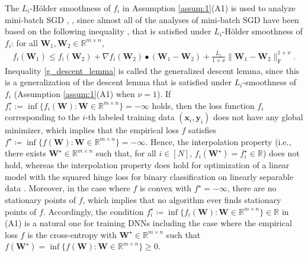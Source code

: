 \documentclass[twoside,11pt]{article}
\begin{document}
The $L_i$-H\"{o}lder smoothness \citep{Hoelder1882} of $f_i$ in Assumption \ref{assum:1}(A1) is used to analyze mini-batch SGD \citep[Assumption 4]{fatkhullin2025can}, \citep[Assumption 2.1]{yamada_2026}, since almost all of the analyses of mini-batch SGD have been based on the following inequality \citep[(2.5)]{Nesterov:2015aa}, \citep[Lemma 1]{Yashtini:2016aa} that is satisfied under $L_i$-H\"{o}lder smoothness of $f_i$: for all $\bm{W}_1, \bm{W}_2 \in \mathbb{R}^{m \times n}$,
\begin{align}\label{g_descent_lemma} 
f_i(\bm{W}_1) 
\leq f_i(\bm{W}_2) + \nabla f_i (\bm{W}_2) \bullet (\bm{W}_1 - \bm{W}_2)
+ \frac{L_i}{1 + \nu}\| \bm{W}_1 - \bm{W}_2 \|_{\mathrm{F}}^{1 + \nu}. 
\end{align}
Inequality \eqref{g_descent_lemma} is called the generalized descent lemma, since this is a generalization of the descent lemma \citep[Lemma 5.7]{beck2017} that is satisfied under $L_i$-smoothness of $f_i$ (Assumption \ref{assum:1}(A1) when $\nu = 1$). If $f_i^\star := \inf \{ f_i(\bm{W}) \colon \bm{W} \in \mathbb{R}^{m \times n} \} = - \infty$ holds, then the loss function $f_i$ corresponding to the $i$-th labeled training data $(\bm{x}_i, \bm{y}_i)$ does not have any global minimizer, which implies that the empirical loss $f$ satisfies $f^\star \coloneqq \inf \{ f(\bm{W}) \colon \bm{W} \in \mathbb{R}^{m \times n} \} = - \infty$. Hence, the interpolation property \citep[Section 4.3.1]{garrigos2024handbookconvergencetheoremsstochastic} (i.e., there exists $\bm{W}^\star \in \mathbb{R}^{m \times n}$ such that, for all $i\in [N]$, $f_i (\bm{W}^\star) = f_i^\star \in \mathbb{R}$) does not hold, whereas the interpolation property does hold for optimization of a linear model with the squared hinge loss for binary classification on linearly separable data \citep[Section 2]{NEURIPS2019_2557911c}. Moreover, in the case where $f$ is convex with $f^\star = - \infty$, there are no stationary points of $f$, which implies that no algorithm ever finds stationary points of $f$. Accordingly, the condition $f_i^\star \coloneqq \inf \{ f_i(\bm{W}) \colon \bm{W} \in \mathbb{R}^{m \times n} \} \in \mathbb{R}$ in (A1) is a natural one for training DNNs including the case where the empirical loss $f$ is the cross-entropy with $\bm{W}^\star \in \mathbb{R}^{m \times n}$ such that $f(\bm{W}^\star) = \inf \{ f(\bm{W}) \colon \bm{W} \in \mathbb{R}^{m \times n} \} \geq 0$.
\end{document}
